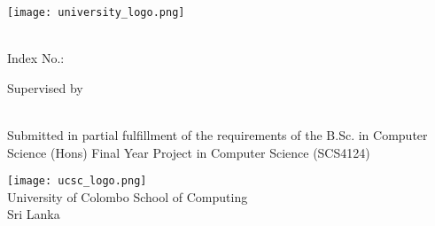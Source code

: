 \begin{titlepage}
    \begin{center}
   		\texttt{[image: university\_logo.png]}
   		\bigbreak
   		\textbf{\huge{\TOPIC}}
   		\vspace{2.0cm}
        
       	{\Large{\NAME}}\\
        \vspace{0.2cm}
        Index No.: \INDEXNO
        
        \vspace{1.2cm}
        Supervised by\\
        \vspace{0.2cm}
        {\Large{\SUPERVISOR}}\\
        
         \vspace{1.0cm}
        
        Submitted in partial fulfillment of the requirements of the B.Sc. in Computer Science (Hons) Final Year Project in Computer Science (SCS4124)
        \vspace{1.8cm}
        
        \texttt{[image: ucsc\_logo.png]}\\
        \vspace{0.5cm}
        University of Colombo School  of Computing\\
        Sri Lanka\\
        \DATE
    \end{center}
\end{titlepage}